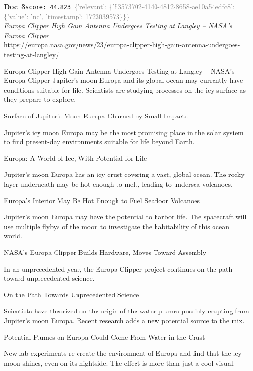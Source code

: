 \documentclass[a4paper,11pt]{article}
\begin{document}
\begin{docenv}
{\footnotesize\textcolor{doccolor}{\textbf{Doc~3}}}\hfill{\tiny\texttt{score:~44.823}}\ {\tiny\textcolor{gray}{\{'relevant': \{'53573702-4140-4812-8658-ae10a54edfc8': \{'value': 'no', 'timestamp': 1723039573\}\}\}}}\\[3pt]
{\small\textit{Europa Clipper High Gain Antenna Undergoes Testing at Langley – NASA's Europa Clipper}}\\[2pt]
{\tiny\url{https://europa.nasa.gov/news/23/europa-clipper-high-gain-antenna-undergoes-testing-at-langley/}}\\[4pt]
{\footnotesize Europa Clipper High Gain Antenna Undergoes Testing at Langley – NASA's Europa Clipper
Jupiter’s moon Europa and its global ocean may currently have conditions suitable for life. Scientists are studying processes on the icy surface as they prepare to explore.

Surface of Jupiter's Moon Europa Churned by Small Impacts

Jupiter’s icy moon Europa may be the most promising place in the solar system to find present-day environments suitable for life beyond Earth. 

Europa: A World of Ice, With Potential for Life

Jupiter’s moon Europa has an icy crust covering a vast, global ocean. The rocky layer underneath may be hot enough to melt, leading to undersea volcanoes.

Europa's Interior May Be Hot Enough to Fuel Seafloor Volcanoes

Jupiter’s moon Europa may have the potential to harbor life. The spacecraft will use multiple flybys of the moon to investigate the habitability of this ocean world.

NASA's Europa Clipper Builds Hardware, Moves Toward Assembly

In an unprecedented year, the Europa Clipper project continues on the path toward unprecedented science. 

On the Path Towards Unprecedented Science

Scientists have theorized on the origin of the water plumes possibly erupting from Jupiter's moon Europa. Recent research adds a new potential source to the mix.

Potential Plumes on Europa Could Come From Water in the Crust

New lab experiments re-create the environment of Europa and find that the icy moon shines, even on its nightside. The effect is more than just a cool visual.

}
\end{docenv}
\end{document}

